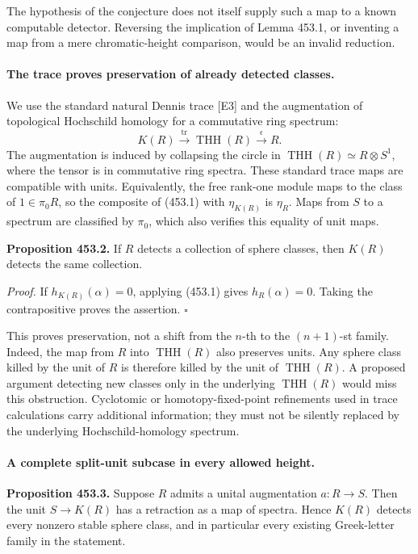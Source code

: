 \documentclass[11pt]{article}
\begin{document}
The hypothesis of the conjecture does not itself supply such a map to
a known computable detector. Reversing the implication of Lemma 453.1,
or inventing a map from a mere chromatic-height comparison, would be
an invalid reduction.

\paragraph{The trace proves preservation of already detected classes.}
We use the standard natural Dennis trace [E3] and the augmentation of
topological Hochschild homology for a commutative ring spectrum:
\[
 K(R)\stackrel{\operatorname{tr}}{\longrightarrow}\operatorname{THH}(R)
       \stackrel{\epsilon}{\longrightarrow}R.
 \tag{453.1}
\]
The augmentation is induced by collapsing the circle in
$\operatorname{THH}(R)\simeq R\otimes S^1$, where the tensor is
in commutative ring spectra. These standard trace maps are compatible
with units. Equivalently, the free rank-one module maps to the class
of $1\in\pi_0R$, so the composite of (453.1) with
$\eta_{K(R)}$ is $\eta_R$. Maps from $S$ to a spectrum are classified
by $\pi_0$, which also verifies this equality of unit maps.

\textbf{Proposition 453.2.} If $R$ detects a collection of sphere
classes, then $K(R)$ detects the same collection.

\emph{Proof.}
If $h_{K(R)}(\alpha)=0$, applying (453.1) gives
$h_R(\alpha)=0$. Taking the contrapositive proves the assertion.
\hfill$\square$

This proves preservation, not a shift from the $n$-th to the
$(n+1)$-st family. Indeed, the map from $R$ into
$\operatorname{THH}(R)$ also preserves units. Any sphere class killed
by the unit of $R$ is therefore killed by the unit of
$\operatorname{THH}(R)$. A proposed argument detecting new classes
only in the underlying $\operatorname{THH}(R)$ would miss this
obstruction. Cyclotomic or homotopy-fixed-point refinements used in
trace calculations carry additional information; they must not be
silently replaced by the underlying Hochschild-homology spectrum.

\paragraph{A complete split-unit subcase in every allowed height.}
\textbf{Proposition 453.3.} Suppose $R$ admits a unital augmentation
$a:R\to S$. Then the unit $S\to K(R)$ has a retraction as a map
of spectra. Hence $K(R)$ detects every nonzero stable sphere class,
and in particular every existing Greek-letter family in the statement.
\end{document}

